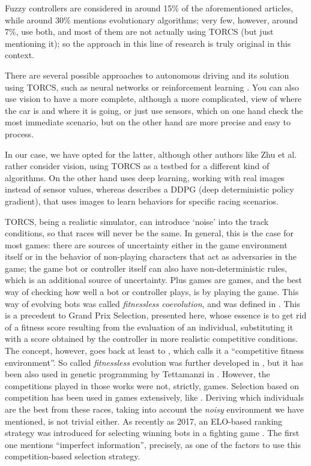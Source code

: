 \documentclass[10pt,journal,compsoc]{IEEEtran}
\begin{document}
Fuzzy controllers are considered in around 15\% of the aforementioned articles, while around 30\% mentions evolutionary algorithms; very few, however, around 7\%, use both, and most of them are not actually using TORCS (but just mentioning it); so the approach in this line of research is truly original in this context.

There are several possible approaches to autonomous driving and its
solution using TORCS, such as neural networks or reinforcement learning \cite{abuzekry2comparative}. 
You can also use vision to have a more complete, although a more complicated, view of where the car is and where it is going, or just use sensors, which on one hand check the most immediate scenario, but on the other hand are more precise and easy to process.

In our case, we have opted for the latter, although other authors like Zhu et al. \cite{zhu2019vision} rather
consider vision, using TORCS as a testbed for a different kind of
algorithms. On the other hand \cite{8833873} uses deep learning, working with real images instead of sensor values, whereas \cite{Kaushik_2018_ECCV_Workshops} describes a DDPG (deep deterministic policy gradient), that uses images to learn behaviors for specific racing scenarios.

TORCS, being a realistic simulator, can introduce `noise' into the
track conditions, so that races will never be the same. In general,
this is the case for most games: there are sources of uncertainty
either in the game environment itself or in the behavior of
non-playing characters that act as adversaries in the game; the game
bot or controller itself can also have non-deterministic rules, which
is an additional source of uncertainty. Plus games are games, and the
best way of checking how well a bot or controller plays, is by playing
the game. This way of evolving bots was called {\em fitnessless
coevolution}, and was defined in
\cite{Jaskowski:2008:FC:1389095.1389161}. This is a precedent to Grand
Prix Selection, presented here, whose essence is to get rid of a
fitness score resulting from the evaluation of an individual,
substituting it with a score obtained by the controller in more
realistic competitive conditions.
The concept, however, goes back at least to
\cite{Angeline:1993:CEE:645513.657590}, which calls it a ``competitive
fitness environment''. So called {\em fitnessless} evolution was further developed in
\cite{rosin1995methods}, but it has been also used in genetic
programming by Tettamanzi in \cite{tettamanzi1996genetic}.
However, the competitions played in those works were not, strictly,
games. Selection based on competition has been used in games extensively, like
\cite{Jaskowski2008,jaskowski2008winning,fernandez2016_only_one}.
Deriving which individuals are the best from these races, taking into account
the {\em noisy} environment we have mentioned, is not trivial
either. As recently as 2017, an ELO-based ranking strategy was
introduced for selecting winning bots in a fighting game
\cite{7792145}. The first one mentions ``imperfect information'',
precisely, as one of the factors to use this competition-based selection strategy.
\end{document}
